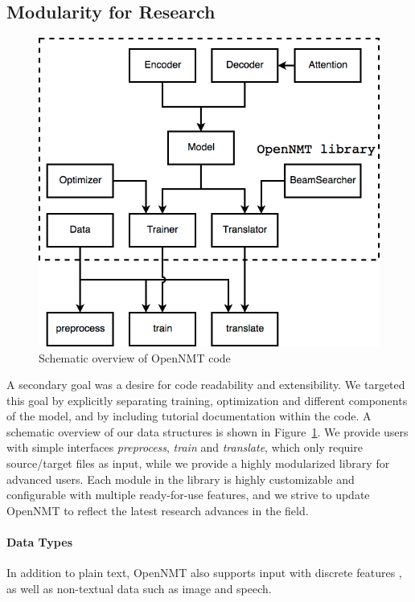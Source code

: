 \documentclass[]{article}
\begin{document}
\subsection{Modularity for Research}
\begin{figure}
        \centering
        \includegraphics[scale=0.36]{OpenNMTDiagram.png}
        \caption{\label{fig:codestruct}Schematic overview of OpenNMT code}
    \end{figure}
A secondary goal was a desire for code readability and extensibility.
We targeted this goal by explicitly separating training, optimization and different components of the model, and by including tutorial documentation within
the code. A schematic overview of our data structures is shown in Figure~\ref{fig:codestruct}. We provide users with simple interfaces \textit{preprocess}, \textit{train} and \textit{translate}, which only require source/target files as input, while we provide a highly modularized library for advanced users. Each module in the library is highly customizable and configurable with multiple ready-for-use features, and we strive to update OpenNMT to reflect the latest research advances in the field.

\paragraph{Data Types} In addition to plain text, OpenNMT also supports input with discrete features \citep{sennrich2016linguistic}, as well as non-textual data such as image and speech. 
\end{document}
